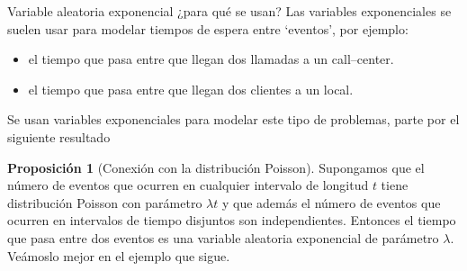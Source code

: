\documentclass{beamer}
\theoremstyle{definition}
\newtheorem{proposition}{Proposici\'on}
\begin{document}
\begin{frame}{\color{rosee}Variable aleatoria exponencial ¿para qué se usan?}
  Las variables exponenciales se suelen usar para modelar tiempos de
  espera entre `eventos', por ejemplo:
  \begin{itemize}
  \item el tiempo que pasa entre que llegan dos llamadas a un call--center.
  \item el tiempo que pasa entre que llegan dos clientes a un local.
  \end{itemize}
  Se usan variables exponenciales para modelar este tipo de problemas,
  parte por el siguiente resultado
  \begin{proposition}[Conexi\'on con la distribuci\'on Poisson]
    Supongamos que el n\'umero de eventos que ocurren en cualquier
    intervalo de longitud $t$ tiene distribuci\'on Poisson con par\'ametro
    $\lambda t$ y que adem\'as el n\'umero de eventos que ocurren en
    intervalos de tiempo disjuntos son independientes. Entonces el tiempo
    que pasa entre dos eventos es una variable aleatoria exponencial de
    par\'ametro $\lambda$. Veámoslo mejor en el ejemplo que sigue.
  \end{proposition}
\end{frame}
\end{document}
